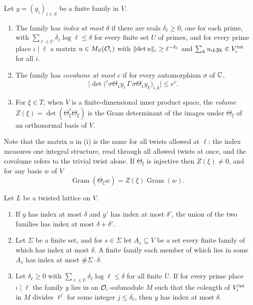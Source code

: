 \begin{definition}\label{def:index-covolume}
Let $y=(y_i)_{i\in S}$ be a finite family in $V$.
\begin{enumerate}[label=\textup{(\roman*)}]
\item The family has \emph{index at most $\delta$} if there are reals $\delta_\ell\ge0$, one for each
prime, with $\sum_{\ell\in U}\delta_\ell\log\ell\le\delta$ for every finite set $U$ of primes, and for
every prime place $\iota\mid\ell$ a matrix $u\in M_S(\mathcal{O}_\iota)$ with
$\lVert \det u\rVert_\iota\ge\ell^{-\delta_\ell}$ and $\sum_ku_{ik}y_k\in V^{\rm int}_\iota$ for all $i$.
\item The family has \emph{covolume at most $c$} if for every automorphism $\sigma$ of $\mathbb{C}$,
\[
  \bigl\lvert\det\bigl({}^t\overline{\sigma\Theta_1y_i}\,\Gamma\,\sigma\Theta_1y_k\bigr)_{i,k}\bigr\rvert
  \le e^c.
\]
\item For $\xi\in T$, when $V$ is a finite-dimensional inner product space, the \emph{volume}
$Z(\xi)=\det(\Theta_\xi^*\Theta_\xi)$ is the Gram determinant of the images under $\Theta_\xi$ of an
orthonormal basis of $V$.
\end{enumerate}
\end{definition}

Note that the matrix $u$ in (i) is the same for all twists allowed at $\ell$: the index measures one
integral structure, read through all allowed twists at once, and the covolume refers to the trivial
twist alone. If $\Theta_\xi$ is injective then $Z(\xi)\neq0$, and for any basis $w$ of $V$
\begin{equation}\label{eq:gram-volume}
  \operatorname{Gram}(\Theta_\xi w)=Z(\xi)\operatorname{Gram}(w).
\end{equation}

\begin{lemma}\label{lem:index-calculus}
Let $L$ be a twisted lattice on $V$.
\begin{enumerate}[label=\textup{(\alph*)}]
\item If $y$ has index at most $\delta$ and $y'$ has index at most $\delta'$, the union of the two
families has index at most $\delta+\delta'$.
\item Let $\Sigma$ be a finite set, and for $s\in \Sigma$ let $A_s\subseteq V$ be a set every finite family of
which has index at most $\delta$. A finite family each member of which lies in some $A_s$ has index
at most $\#\Sigma\cdot\delta$.
\item Let $\delta_\ell\ge0$ with $\sum_{\ell\in U}\delta_\ell\log\ell\le\delta$ for all finite $U$.
If for every prime place $\iota\mid\ell$ the family $y$ lies in an $\mathcal{O}_\iota$-submodule $M$ such that
the colength of $V^{\rm int}_\iota$ in $M$ divides $\ell^j$ for some integer $j\le\delta_\ell$, then
$y$ has index at most $\delta$.
\end{enumerate}
\end{lemma}

